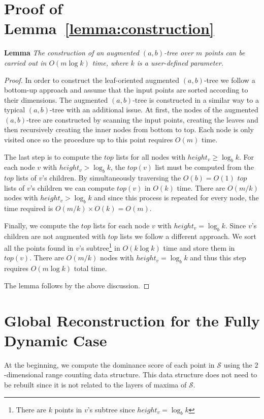 \documentclass{llncs}
\begin{document}
\section{Proof of Lemma~\ref{lemma:construction}} \label{app:construction}


\textbf{Lemma} \textit{The construction of an augmented $(a,b)$-tree over $m$ points can be carried out in $O(m\log{k})$ time, where $k$ is a user-defined parameter.}

\begin{proof}
In order to construct the leaf-oriented augmented $(a,b)$-tree we follow a bottom-up approach and assume that the input points are sorted according to their dimensions. The augmented $(a,b)$-tree is constructed in a similar way to a typical $(a,b)$-tree with an additional issue. At first, the nodes of the augmented $(a,b)$-tree are constructed by scanning the input points, creating the leaves and then recursively creating the inner nodes from bottom to top. Each node is only visited once so the procedure up to this point requires $O(m)$ time.

The last step is to compute the $top$ lists for all nodes with $height_v \geq \log_{b}{k}$. For each node $v$ with $height_v > \log_{b}{k}$, the $top(v)$ list must be computed from the $top$ lists of $v$'s children. By simultaneously traversing the $O(b)=O(1)$ $top$ lists of $v$'s children we can compute $top(v)$ in $O(k)$ time. There are $O(m/k)$ nodes with $height_v > \log_{b}{k}$ and since this process is repeated for every node, the time required is $O(m/k)\times O(k)=O(m)$.

Finally, we compute the $top$ lists for each node $v$ with $height_v = \log_{b}{k}$. Since $v$'s children are not augmented with $top$ lists we follow a different approach. We sort all the points found in $v$'s subtree\footnote{There are $k$ points in $v$'s subtree since $height_v = \log_{b}{k}$} in $O(k\log{k})$ time and store them in $top(v)$. There are $O(m/k)$ nodes with $height_v = \log_{b}{k}$ and thus this step requires $O(m\log{k})$ total time.

The lemma follows by the above discussion.
\end{proof}


\section{Global Reconstruction for the Fully Dynamic Case} \label{app:global}

At the beginning, we compute the dominance score of each point in $\mathcal{S}$ using the $2$-dimensional range counting data structure. This data structure does not need to be rebuilt since it is not related to the layers of maxima of $\mathcal{S}$.
\end{document}
